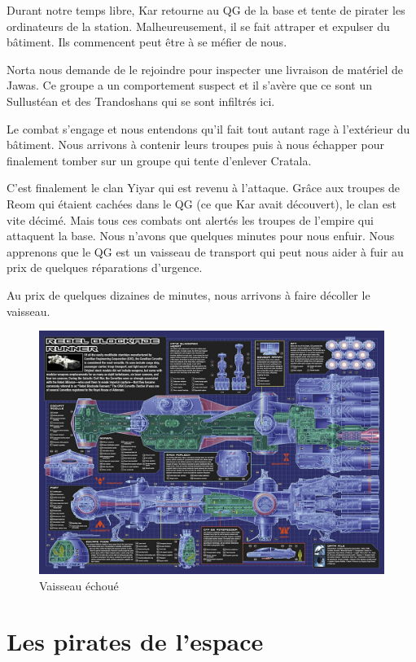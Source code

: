 \documentclass[a4paper,9pt,twoside,twocolumn,openany]{book}
\begin{document}
Durant notre temps libre, Kar retourne au QG de la base et tente de pirater les ordinateurs de la station. Malheureusement, il se fait attraper et expulser du bâtiment. Ils commencent peut être à se méfier de nous.

Norta nous demande de le rejoindre pour inspecter une livraison de matériel de Jawas. Ce groupe a un comportement suspect et il s’avère que ce sont un Sullustéan et des Trandoshans qui se sont infiltrés ici.

Le combat s’engage et nous entendons qu’il fait tout autant rage à l’extérieur du bâtiment. Nous arrivons à contenir leurs troupes puis à nous échapper pour finalement tomber sur un groupe qui tente d’enlever Cratala.

C’est finalement le clan Yiyar qui est revenu à l’attaque. Grâce aux troupes de Reom qui étaient cachées dans le QG (ce que Kar avait découvert), le clan est vite décimé. Mais tous ces combats ont alertés les troupes de l’empire qui attaquent la base. Nous n’avons que quelques minutes pour nous enfuir. Nous apprenons que le QG est un vaisseau de transport qui peut nous aider à fuir au prix de quelques réparations d’urgence. 

Au prix de quelques dizaines de minutes, nous arrivons à faire décoller le vaisseau.

\begin{figure}
\centering
    \includegraphics[width=1.0\textwidth]{img/vaisseau_echoue}
    \caption{Vaisseau échoué}
\end{figure}

\chapter{Les pirates de l'espace}
\end{document}
